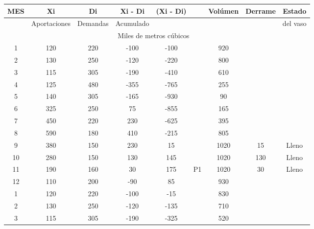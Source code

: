 \begin{table}[h!]
    \centering
    \begin{tabular}{@{}ccccccccc@{}}
    \toprule
    MES & Xi           & Di       & Xi - Di   & (Xi - Di) &    & Volúmen & Derrame & Estado   \\ \midrule
        & Aportaciones & Demandas & Acumulado &           &    &         &         & del vaso \\
        & \multicolumn{7}{c}{Miles de metros cúbicos}                              &          \\
    1   & 120          & 220      & -100      & -100      &    & 920     &         &          \\
    2   & 130          & 250      & -120      & -220      &    & 800     &         &          \\
    3   & 115          & 305      & -190      & -410      &    & 610     &         &          \\
    4   & 125          & 480      & -355      & -765      &    & 255     &         &          \\
    5   & 140          & 305      & -165      & -930      &    & 90      &         &          \\
    6   & 325          & 250      & 75        & -855      &    & 165     &         &          \\
    7   & 450          & 220      & 230       & -625      &    & 395     &         &          \\
    8   & 590          & 180      & 410       & -215      &    & 805     &         &          \\
    9   & 380          & 150      & 230       & 15        &    & 1020    & 15      & Lleno    \\
    10  & 280          & 150      & 130       & 145       &    & 1020    & 130     & Lleno    \\
    11  & 190          & 160      & 30        & 175       & P1 & 1020    & 30      & Lleno    \\
    12  & 110          & 200      & -90       & 85        &    & 930     &         &          \\
    1   & 120          & 220      & -100      & -15       &    & 830     &         &          \\
    2   & 130          & 250      & -120      & -135      &    & 710     &         &          \\
    3   & 115          & 305      & -190      & -325      &    & 520     &         &          \\

\end{tabular}
\end{table}
